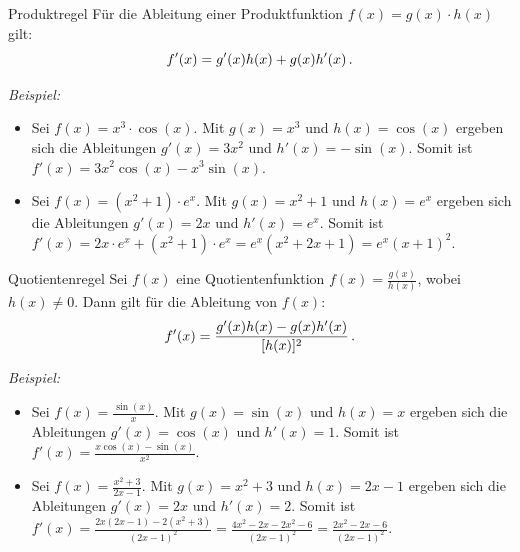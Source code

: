 \begin{rememberbox}{Produktregel}
Für die Ableitung einer Produktfunktion $f(x) = g(x) \cdot h(x)$ gilt:
\begin{equation}
    f'(x) = g'(x)h(x) + g(x)h'(x)\,.
\end{equation}
\end{rememberbox}
\textit{Beispiel:}
\begin{itemize}
    \item Sei $f(x) = x^3 \cdot \cos(x)$. Mit $g(x) = x^3$ und $h(x) = \cos(x)$ ergeben sich die Ableitungen $g'(x) = 3x^2$ und $h'(x) = -\sin(x)$.\newline
    Somit ist $f'(x) = 3x^2 \cos(x) - x^3 \sin(x)$.
    \item Sei $f(x) = (x^2+1) \cdot e^x$. Mit $g(x) = x^2+1$ und $h(x) = e^x$ ergeben sich die Ableitungen $g'(x) = 2x$ und $h'(x) = e^x$.\newline
    Somit ist $f'(x) = 2x \cdot e^x + (x^2+1) \cdot e^x = e^x(x^2+2x+1) = e^x(x+1)^2$.
\end{itemize}

\begin{rememberbox}{Quotientenregel}
Sei $f(x)$ eine Quotientenfunktion $f(x) = \frac{g(x)}{h(x)}$, wobei $h(x) \neq 0$. Dann gilt für die Ableitung von $f(x)$:
\begin{equation}
    f'(x) = \frac{g'(x)h(x) - g(x)h'(x)}{[h(x)]^2}\,.
\end{equation}
\end{rememberbox}
\textit{Beispiel:}
\begin{itemize}
    \item Sei $f(x) = \frac{\sin(x)}{x}$. Mit $g(x) = \sin(x)$ und $h(x) = x$ ergeben sich die Ableitungen $g'(x) = \cos(x)$ und $h'(x) = 1$.\newline
    Somit ist $f'(x) = \frac{x\cos(x) - \sin(x)}{x^2}$.
    \item Sei $f(x) = \frac{x^2+3}{2x-1}$. Mit $g(x) = x^2+3$ und $h(x) = 2x-1$ ergeben sich die Ableitungen $g'(x) = 2x$ und $h'(x) = 2$.\newline
    Somit ist $f'(x) = \frac{2x(2x-1) - 2(x^2+3)}{(2x-1)^2} = \frac{4x^2-2x-2x^2-6}{(2x-1)^2} = \frac{2x^2-2x-6}{(2x-1)^2}$.
\end{itemize}

